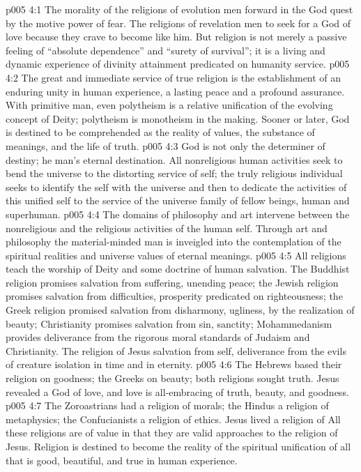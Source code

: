 \vs p005 4:1 The morality of the religions of evolution  men forward in the God quest by the motive power of fear. The religions of revelation  men to seek for a God of love because they crave to become like him. But religion is not merely a passive feeling of “absolute dependence” and “surety of survival”; it is a living and dynamic experience of divinity attainment predicated on humanity service.
\vs p005 4:2 The great and immediate service of true religion is the establishment of an enduring unity in human experience, a lasting peace and a profound assurance. With primitive man, even polytheism is a relative unification of the evolving concept of Deity; polytheism is monotheism in the making. Sooner or later, God is destined to be comprehended as the reality of values, the substance of meanings, and the life of truth.
\vs p005 4:3 God is not only the determiner of destiny; he  man’s eternal destination. All nonreligious human activities seek to bend the universe to the distorting service of self; the truly religious individual seeks to identify the self with the universe and then to dedicate the activities of this unified self to the service of the universe family of fellow beings, human and superhuman.
\vs p005 4:4 \pc The domains of philosophy and art intervene between the nonreligious and the religious activities of the human self. Through art and philosophy the material\hyp{}minded man is inveigled into the contemplation of the spiritual realities and universe values of eternal meanings.
\vs p005 4:5 \pc All religions teach the worship of Deity and some doctrine of human salvation. The Buddhist religion promises salvation from suffering, unending peace; the Jewish religion promises salvation from difficulties, prosperity predicated on righteousness; the Greek religion promised salvation from disharmony, ugliness, by the realization of beauty; Christianity promises salvation from sin, sanctity; Mohammedanism provides deliverance from the rigorous moral standards of Judaism and Christianity. The religion of Jesus  salvation from self, deliverance from the evils of creature isolation in time and in eternity.
\vs p005 4:6 The Hebrews based their religion on goodness; the Greeks on beauty; both religions sought truth. Jesus revealed a God of love, and love is all\hyp{}embracing of truth, beauty, and goodness.
\vs p005 4:7 The Zoroastrians had a religion of morals; the Hindus a religion of metaphysics; the Confucianists a religion of ethics. Jesus lived a religion of  All these religions are of value in that they are valid approaches to the religion of Jesus. Religion is destined to become the reality of the spiritual unification of all that is good, beautiful, and true in human experience.
